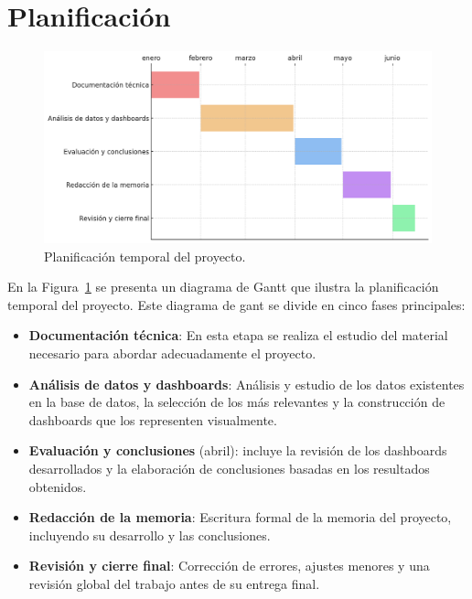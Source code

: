 \documentclass[a4paper, 12pt]{book}
\begin{document}
\section{Planificación}
\label{sec:objetivos}

\begin{figure}[H]
    \centering
    \includegraphics[width=\textwidth]{img/gant.png}
    \caption{Planificación temporal del proyecto.}
    \label{fig:planificacion}
\end{figure}

En la Figura~\ref{fig:planificacion} se presenta un diagrama de Gantt que ilustra la planificación temporal del proyecto. Este diagrama de gant se divide en cinco fases principales:

\begin{itemize}
    \item \textbf{Documentación técnica}: En esta etapa se realiza el estudio del material necesario para abordar adecuadamente el proyecto.
    \item \textbf{Análisis de datos y dashboards}: Análisis y estudio de los datos existentes en la base de datos, la selección de los más relevantes y la construcción de dashboards que los representen visualmente.
    \item \textbf{Evaluación y conclusiones} (abril): incluye la revisión de los dashboards desarrollados y la elaboración de conclusiones basadas en los resultados obtenidos.
    \item \textbf{Redacción de la memoria}: Escritura formal de la memoria del proyecto, incluyendo su desarrollo y las conclusiones.
    \item \textbf{Revisión y cierre final}: Corrección de errores, ajustes menores y una revisión global del trabajo antes de su entrega final.
\end{itemize}
\end{document}
